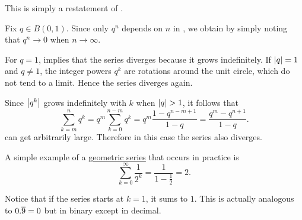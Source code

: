 \begin{RefListProof}
     This is simply a restatement of .

     Fix \( q \in B(0, 1) \). Since only \( q^n \) depends on \( n \) in , we obtain  by simply noting that \( q^n \to 0 \) when \( n \to \infty \).

     For \( q = 1 \),  implies that the series diverges because it grows indefinitely. If \( \left\vert q \right\vert = 1 \) and \( q \neq 1 \), the integer powers \( q^k \) are rotations around the unit circle, which do not tend to a limit. Hence the series diverges again.

    Since \( \left\vert q^k \right\vert \) grows indefinitely with \( k \) when \( \left\vert q \right\vert > 1 \), it follows that
    \begin{equation*}\label{thm:geometric_progression/cauchy_partial_sum}
      \sum_{k=m}^n q^k
      =
      q^m \sum_{k=0}^{n-m} q^k
      =
      q^m \frac {1 - q^{n-m+1}} {1 - q}
      =
      \frac {q^m - q^{n+1}} {1 - q}.
    \end{equation*}
    can get arbitrarily large. Therefore in this case the series also diverges.
\end{RefListProof}

\begin{Example}\label{ex:series_of_reciprocal_powers_of_two}
  A simple example of a \hyperref[def:geometric_progression/series]{geometric series} that occurs in practice is
  \begin{equation}\label{ex:series_of_reciprocal_powers_of_two/series}
    \sum_{k=0}^\infty \frac 1 {2^k} = \frac 1 {1 - \frac 1 2} = 2.
  \end{equation}

  Notice that if the series starts at \( k = 1 \), it sums to \( 1 \). This is actually analogous to \( 0.\overline{9} = 0 \) but in binary except in decimal.
\end{Example}

